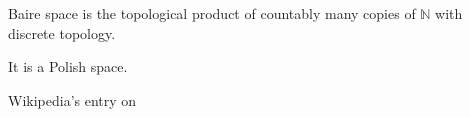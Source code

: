\documentclass[12pt]{article}
\newcommand{\N}[0]{\mathbb{N}}
\begin{document}
Baire space is the topological product of countably many copies of $\N$ with discrete topology.

It is a Polish space.

\begin{thebibliography}{9}
 Wikipedia's entry on 
\end{thebibliography} 

\end{document}

